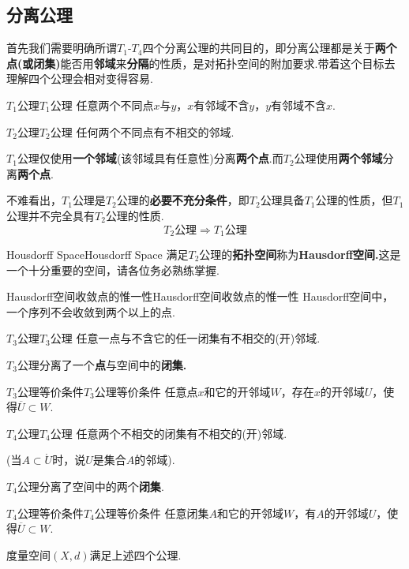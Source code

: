 \documentclass{ctexart}
\begin{document}
\subsection{分离公理}
首先我们需要明确所谓$T_1$-$T_4$四个分离公理的共同目的，即分离公理都是关于\textbf{两个点(或闭集)}能否用\textbf{邻域}来\textbf{分隔}的性质，是对拓扑空间的附加要求.带着这个目标去理解四个公理会相对变得容易.
\begin{定义}{$T_1$公理}{$T_1$公理}
	任意两个不同点$x$与$y$，$x$有邻域不含$y$，$y$有邻域不含$x$.
\end{定义}
\begin{定义}{$T_2$公理}{$T_2$公理}
	任何两个不同点有不相交的邻域.
\end{定义}
\begin{提示}
	$T_1$公理仅使用\textbf{一个邻域}(该邻域具有任意性)分离\textbf{两个点}.而$T_2$公理使用\textbf{两个邻域}分离\textbf{两个点}.
\end{提示}
\begin{注意}
	不难看出，$T_1$公理是$T_2$公理的\textbf{必要不充分条件}，即$T_2$公理具备$T_1$公理的性质，但$T_1$公理并不完全具有$T_2$公理的性质.$$T_2\text{公理}\Rightarrow T_1\text{公理}$$
\end{注意}
\begin{定义}{Housdorff Space}{Housdorff Space}
	满足$T_2$公理的\textbf{拓扑空间}称为\textbf{Hausdorff空间.}这是一个十分重要的空间，请各位务必熟练掌握.
\end{定义}
\begin{命题}{Hausdorff空间收敛点的惟一性}{Hausdorff空间收敛点的惟一性}
	Hausdorff空间中，一个序列不会收敛到两个以上的点.
\end{命题}
\begin{定义}{$T_3$公理}{$T_3$公理}
	任意一点与不含它的任一闭集有不相交的(开)邻域.
\end{定义}
\begin{提示}
	$T_3$公理分离了一个\textbf{点}与空间中的\textbf{闭集.}
\end{提示}
\begin{命题}{$T_3$公理等价条件}{$T_3$公理等价条件}
	任意点$x$和它的开邻域$W$，存在$x$的开邻域$U$，使得$\overline{U} \subset W.$
\end{命题}
\begin{定义}{$T_4$公理}{$T_4$公理}
	任意两个不相交的闭集有不相交的(开)邻域.
	
	(当$ A\subset\mathring{U}$时，说$U$是集合$A$的邻域).
\end{定义}
\begin{提示}
	$T_4$公理分离了空间中的两个\textbf{闭集}.
\end{提示}
\begin{命题}{$T_4$公理等价条件}{$T_4$公理等价条件}
	任意闭集$A$和它的开邻域$W$，有$A$的开邻域$U$，使得$ \overline{U}\subset W.$
\end{命题}
\begin{命题}{}{}
	度量空间$(X,d)$满足上述四个公理.
\end{命题}
\end{document}
